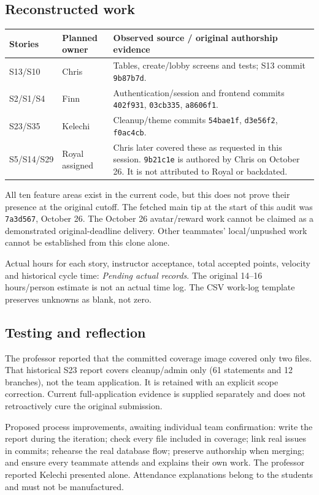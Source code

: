 \documentclass[11pt,a4paper]{article}
\newcommand{\pending}{\textit{Pending actual records}}
\begin{document}
\subsection{Reconstructed work}
\begin{tabularx}{\textwidth}{@{}l l X@{}}
\toprule Stories & Planned owner & Observed source / original authorship evidence\\\midrule
S13/S10 & Chris & Tables, create/lobby screens and tests; S13 commit \texttt{9b87b7d}.\\
S2/S1/S4 & Finn & Authentication/session and frontend commits \texttt{402f931}, \texttt{03cb335}, \texttt{a8606f1}.\\
S23/S35 & Kelechi & Cleanup/theme commits \texttt{54bae1f}, \texttt{d3e56f2}, \texttt{f0ac4cb}.\\
S5/S14/S29 & Royal assigned & Chris later covered these as requested in this session. \texttt{9b21c1e} is authored by Chris on October 26. It is not attributed to Royal or backdated.\\\bottomrule
\end{tabularx}

All ten feature areas exist in the current code, but this does not prove their presence at the original cutoff. The fetched main tip at the start of this audit was \texttt{7a3d567}, October 26. The October 26 avatar/reward work cannot be claimed as a demonstrated original-deadline delivery. Other teammates' local/unpushed work cannot be established from this clone alone.

Actual hours for each story, instructor acceptance, total accepted points, velocity and historical cycle time: \pending. The original 14--16 hours/person estimate is not an actual time log. The CSV work-log template preserves unknowns as blank, not zero.

\subsection{Testing and reflection}
The professor reported that the committed coverage image covered only two files. That historical S23 report covers cleanup/admin only (61 statements and 12 branches), not the team application. It is retained with an explicit scope correction. Current full-application evidence is supplied separately and does not retroactively cure the original submission.

Proposed process improvements, awaiting individual team confirmation: write the report during the iteration; check every file included in coverage; link real issues in commits; rehearse the real database flow; preserve authorship when merging; and ensure every teammate attends and explains their own work. The professor reported Kelechi presented alone. Attendance explanations belong to the students and must not be manufactured.
\end{document}
